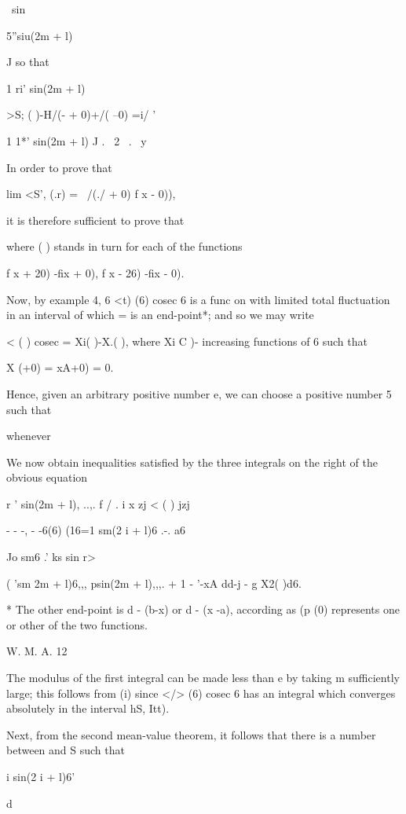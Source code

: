 \ sin

5''siu(2m + l)

J so that

1 ri' sin(2m + l)

>S; ( )-H/(- + 0)+/( --0) =i/ '

  1 1*' sin(2m + l) J . \ 2 \, . \ y

In order to prove that

lim <S', (.r) = \ /(./ + 0) f x - 0)),

it is therefore sufficient to prove that

where ( ) stands in turn for each of the functions

f x + 20) -fix + 0), f x - 26) -fix - 0).

Now, by example 4, 6 <t) (6) cosec 6 is a func on with limited
total fluctuation in an interval of which = is an end-point*; and so
we may write

  < ( ) cosec = Xi( )-X.( ), where Xi C )- %
increasing functions of 6 such that

X (+0) = xA+0) = 0.

Hence, given an arbitrary positive number e, we can choose a positive
number 5 such that

whenever %

We now obtain inequalities satisfied by the three integrals on the
right of the obvious equation

r ' sin(2m + l), ..,. f  / . i x zj < ( ) jzj

 - - -, - -6(6) (16=1 sm(2 i + l)6 .-. a6

Jo sm6 .' ks sin r>

( 'sm 2m + l)6,,, psin(2m + l),,,. + 1 - '-xA dd-j - g X2( )d6.

* The other end-point is d - (b-x) or d - (x -a), according as (p (0)
represents one or other of the two functions.

W. M. A. 12

%
%

The modulus of the first integral can be made less than e by taking m
sufficiently large; this follows from (i) since </> (6) cosec
6 has an integral which converges absolutely in the interval hS, Itt).

Next, from the second mean-value theorem, it follows that there is a
number between and S such that

i sin(2 i + l)6'

d

